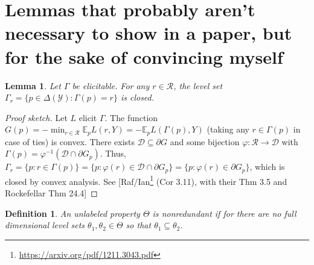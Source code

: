 \documentclass[12pt]{article}
\newcommand{\D}{\mathcal{D}}
\newcommand{\E}{\mathbb{E}}
\newcommand{\R}{\mathcal{R}}
\newcommand{\Y}{\mathcal{Y}}
\newtheorem{lemma}{Lemma}
\newtheorem{definition}{Definition}
\begin{document}
\section{Lemmas that probably aren't necessary to show in a paper, but for the sake of convincing myself}

\begin{lemma}\label{lem:closed-level-sets}
	Let $\Gamma$ be elicitable.
	For any $r\in\R$, the level set $\Gamma_r = \{ p \in \Delta(\Y) : \Gamma(p) = r \}$ is closed.
\end{lemma}
\begin{proof}[Proof sketch]
	Let $L$ elicit $\Gamma$.
	The function $G(p) = -\min_{r\in\R} \E_p L(r,Y) = -\E_p L(\Gamma(p),Y)$ (taking any $r\in\Gamma(p)$ in case of ties) is convex.
	There exists $\D \subseteq \partial G$ and some bijection $\varphi : \R \to \D$ with $\Gamma(p) = \varphi^{-1}(\D\cap \partial G_p)$.
	Thus, $\Gamma_r = \{p : r\in\Gamma(p)\} = \{p : \varphi(r) \in \D\cap\partial G_p\} = \{p : \varphi(r) \in \partial G_p\}$, which is closed by convex analysis.
	See [Raf/Ian\footnote{\url{https://arxiv.org/pdf/1211.3043.pdf}} (Cor 3.11), with their Thm 3.5 and Rockefellar Thm 24.4]  
\end{proof}


\begin{definition}\label{def:unlabeled-nonredundant}
	An unlabeled property $\Theta$ is \emph{nonredundant} if for there are no full dimensional level sets $\theta_1, \theta_2 \in \Theta$ so that $\theta_1 \subseteq \theta_2$.
\end{definition}
\end{document}
